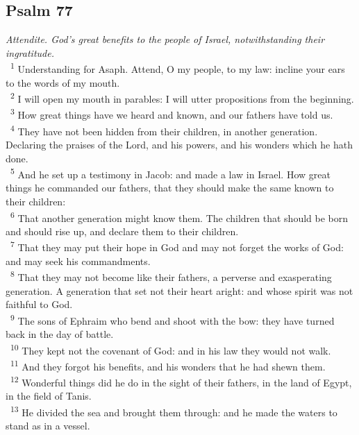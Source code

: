 \documentclass[a5paper,12pt]{article}
\begin{document}
\begin{multicols*}{2}
\section{Psalm 77}
\label{sec:org7159991}
\emph{Attendite. God's great benefits to the people of Israel, notwithstanding their ingratitude.}\\

~\textsuperscript{1} Understanding for Asaph. Attend, O my people, to my law: incline your ears to the words of my mouth.\\
~\textsuperscript{2} I will open my mouth in parables: I will utter propositions from the beginning.\\
~\textsuperscript{3} How great things have we heard and known, and our fathers have told us.\\
~\textsuperscript{4} They have not been hidden from their children, in another generation. Declaring the praises of the Lord, and his powers, and his wonders which he hath done.\\
~\textsuperscript{5} And he set up a testimony in Jacob: and made a law in Israel. How great things he commanded our fathers, that they should make the same known to their children:\\
~\textsuperscript{6} That another generation might know them. The children that should be born and should rise up, and declare them to their children.\\
~\textsuperscript{7} That they may put their hope in God and may not forget the works of God: and may seek his commandments.\\
~\textsuperscript{8} That they may not become like their fathers, a perverse and exasperating generation. A generation that set not their heart aright: and whose spirit was not faithful to God.\\
~\textsuperscript{9} The sons of Ephraim who bend and shoot with the bow: they have turned back in the day of battle.\\
~\textsuperscript{10} They kept not the covenant of God: and in his law they would not walk.\\
~\textsuperscript{11} And they forgot his benefits, and his wonders that he had shewn them.\\
~\textsuperscript{12} Wonderful things did he do in the sight of their fathers, in the land of Egypt, in the field of Tanis.\\
~\textsuperscript{13} He divided the sea and brought them through: and he made the waters to stand as in a vessel.\\

\end{multicols*}
\end{document}
